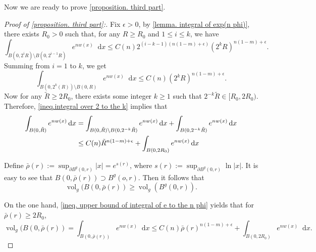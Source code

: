 \documentclass[10pt,a4paper]{amsart}
\numberwithin{equation}{section}
\newcommand{\dx}{\mathop{}\!\mathrm{d}x}
\begin{document}
Now we are ready to prove \cref{proposition. third part}.
\begin{proof}[Proof of \cref{proposition. third part}:]
    Fix $\epsilon>0$, by \cref{lemma. integral of exp(n phi)}, there exists $R_0>0$ such that, for any $R\geq R_0$ and $1\leq i\leq k$, we have
    \[
        \int_{B(0,2^iR)\setminus B(0,2^{i-1}R) }e^{nw(x)}\dx
        \leq C(n)2^{(i-k-1)(n(1-m)+\epsilon)}(2^k R)^{n(1-m)+\epsilon}.
    \]
    Summing from $i=1$ to $k$, we get
    \begin{equation}\label{ineq.integral over 2 to the k}
        \int_{B(0,2^k(R))\setminus B(0,R)}e^{nw(x)}\dx
        \leq C(n)(2^k R)^{n(1-m)+\epsilon}.
    \end{equation}
    Now for any $\tilde{R}\geq 2R_0$, there exists some integer $k\geq 1$ such that $2^{-k}\tilde{R}\in[R_0, 2R_0)$. Therefore, \cref{ineq.integral over 2 to the k} implies that
    \begin{align}
        \int_{B(0,\tilde{R})}e^{nw(x)}\dx
        &=\int_{B(0,\tilde{R})\setminus B(0,2^{-k}\tilde{R}) }
        e^{nw(x)}\dx
        +\int_{B(0,2^{-k}\tilde{R})}
        e^{nw(x)}\dx\notag\\
        &\leq C(n) \tilde{R}^{n(1-m)+\epsilon}
        +\int_{B(0,2R_0)}
        e^{nw(x)}\dx\label{ineq. upper bound of integral of e to the n phi}
    \end{align}

    Define $\bar{\rho}(r):=\sup_{\partial B^g(0,r) }|x|=e^{s(r)}$, where $s(r):=\sup_{\partial B^g(0,r)}\ln |x| $. It is easy to see that 
    $B(0,\bar{\rho}(r))\supset B^g(o,r)$.
    Then it follows that
    \begin{equation}\label{eq.supset volume relation}
        \operatorname{vol}_g(B(0,\bar{\rho}(r))
        \geq \operatorname{vol}_g(B^g(0,r)).
    \end{equation}

    On the one hand, \cref{ineq. upper bound of integral of e to the n phi} yields that for $\bar{\rho}(r)\geq 2R_0$,
    \[
        \operatorname{vol}_g(B(0,\bar{\rho}(r))
        =\int_{B(0,\bar{\rho}(r))} e^{nw(x)}\dx
        \leq
        C(n)\bar{\rho}(r)^{n(1-m)+\epsilon}
        +\int_{B(0,2R_0)}
        e^{nw(x)}\dx. 
    \]
    

\end{proof}
\end{document}
